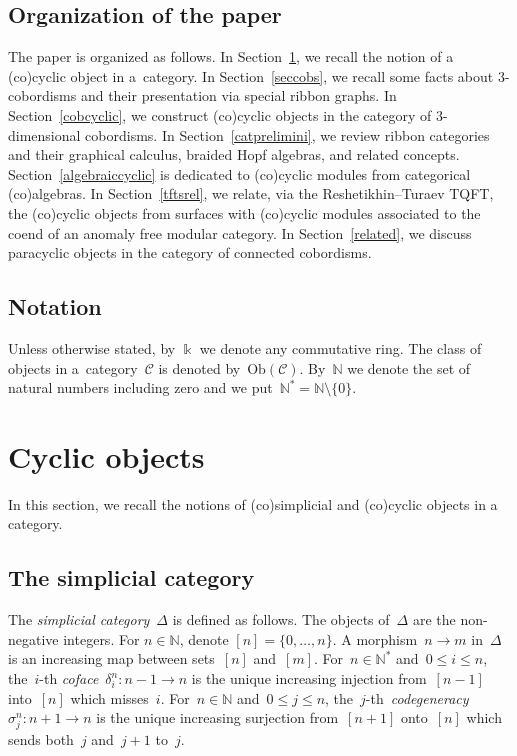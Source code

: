 \documentclass[10pt,a4paper]{amsart}
\numberwithin{equation}{section}
\newcommand{\co}{\colon}
\newcommand{\fs}[1]{[#1]}
\newcommand{\mc}{\mathcal}
\newcommand{\N}{\mathbb{N}}
\newcommand{\Ob}[1]{\mathrm{Ob}(#1)}
\newcommand{\kk}{\Bbbk}
\begin{document}
\subsection{Organization of the paper}
The paper is organized as follows.
In Section~\ref{cyclicprelimini}, we recall the notion of a (co)cyclic object in a~category.
In Section~\ref{seccobs}, we recall some facts about $3$-cobordisms and their presentation via special ribbon graphs. In Section~\ref{cobcyclic}, we construct (co)cyclic objects in the category of $3$-dimensional cobordisms.
In Section~\ref{catprelimini}, we review ribbon categories and their graphical calculus, braided Hopf algebras, and related concepts.
Section~\ref{algebraiccyclic} is dedi\-cated to (co)cyclic modules from categorical (co)algebras.
In Section~\ref{tftsrel}, we relate, via the Reshetikhin--Turaev TQFT, the (co)cyclic objects from surfaces with (co)cyclic modules associated to the coend of an anomaly free modular category. In Section~\ref{related}, we discuss paracyclic objects in the category of connected cobordisms.


\subsection{Notation}
Unless otherwise stated, by $\kk$ we denote any commutative ring. The class of objects in a~category~$\mc C$ is denoted by~$\Ob{\mc C}$.
By~$\mathbb{N}$ we denote the set of natural numbers including zero and we put~$\mathbb{N}^* = \mathbb{N} \setminus \{0\}$.

\section{Cyclic objects} \label{cyclicprelimini}

In this section, we recall the notions of (co)simp\-li\-cial and (co)cyclic objects in a category.

\subsection{The simplicial category}
The \emph{simplicial category}~$\Delta$ is defined as follows.
The objects of~$\Delta$ are the non-negative integers. For $n\in \N$, denote $\fs{n}=\{0, \dots, n\}$.
A morphism~$n\to m$ in~$\Delta$ is an increasing map between sets~$\fs{n}$ and~$\fs{m}$.
For~$n\in \N^*$ and~$0\le i \le n$, the~$i$-th \emph{coface}~$\delta_i^n \co n-1 \to n$ is the unique increasing injection from~$\fs{n-1}$ into~$\fs{n}$ which misses~$i$.
For~$n\in \N$ and~$0\le j \le n$, the~$j$-th~\emph{codegene\-racy}~$\sigma_j^n \co n+1 \to n$ is the unique increasing surjection from~$\fs{n+1}$ onto~$\fs{n}$ which sends both~$j$ and~$j+1$ to~$j$.
\end{document}
